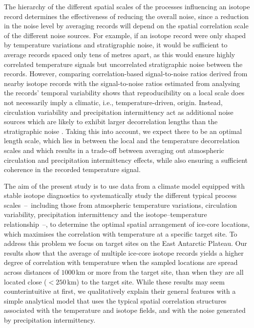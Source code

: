 \documentclass[cp, manuscript]{copernicus}
\begin{document}
The hierarchy of the different spatial scales of the processes influencing an
isotope record determines the effectiveness of reducing the overall noise, since
a reduction in the noise level by averaging records will depend on the spatial
correlation scale of the different noise sources. For example, if an isotope
record were only shaped by temperature variations and stratigraphic noise, it
would be sufficient to average records spaced only tens of metres apart, as this
would ensure highly correlated temperature signals but uncorrelated
stratigraphic noise between the records. However, comparing correlation-based
signal-to-noise ratios derived from nearby isotope records
\citep{Munch2016,Munch2017} with the signal-to-noise ratios estimated from
analysing the records' temporal variability \citep{Laepple2018} shows that
reproducibility on a local scale does not necessarily imply a climatic, i.e.,
temperature-driven, origin. Instead, circulation variability and precipitation
intermittency act as additional noise sources which are likely to exhibit larger
decorrelation lengths than the stratigraphic noise
\citep{Laepple2018,Munch2018a}. Taking this into account, we expect there to be
an optimal length scale, which lies in between the local and the temperature
decorrelation scales and which results in a trade-off between averaging out
atmospheric circulation and precipitation intermittency effects, while also
ensuring a sufficient coherence in the recorded temperature signal.

The aim of the present study is to use data from a climate model equipped with
stable isotope diagnostics to systematically study the different typical process
scales~--~including those from atmospheric temperature variations, circulation
variability, precipitation intermittency and the isotope--temperature
relationship~--, to determine the optimal spatial arrangement of ice-core
locations, which maximises the correlation with temperature at a specific target
site. To address this problem we focus on target sites on the East Antarctic
Plateau. Our results show that the average of multiple ice-core isotope records
yields a higher degree of correlation with temperature when the sampled
locations are spread across distances of $1000$\,km or more from the target
site, than when they are all located close ($<250$\,km) to the target
site. While these results may seem counterintuitive at first, we qualitatively
explain their general features with a simple analytical model that uses the
typical spatial correlation structures associated with the temperature and
isotope fields, and with the noise generated by precipitation intermittency.
\end{document}
